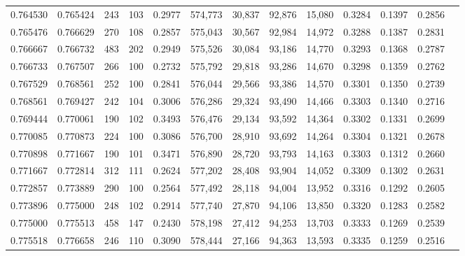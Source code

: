 \begin{tabular}{rrrrrrrrrrrrr}
0.764530 & 0.765424 &    243 &   103 &                                     0.2977 & 574,773 &  30,837 &  92,876 &  15,080 & 0.3284 & 0.1397 & 0.2856 \\
0.765476 & 0.766629 &    270 &   108 &                                     0.2857 & 575,043 &  30,567 &  92,984 &  14,972 & 0.3288 & 0.1387 & 0.2831 \\
0.766667 & 0.766732 &    483 &   202 &                                     0.2949 & 575,526 &  30,084 &  93,186 &  14,770 & 0.3293 & 0.1368 & 0.2787 \\
0.766733 & 0.767507 &    266 &   100 &                                     0.2732 & 575,792 &  29,818 &  93,286 &  14,670 & 0.3298 & 0.1359 & 0.2762 \\
0.767529 & 0.768561 &    252 &   100 &                                     0.2841 & 576,044 &  29,566 &  93,386 &  14,570 & 0.3301 & 0.1350 & 0.2739 \\
0.768561 & 0.769427 &    242 &   104 &                                     0.3006 & 576,286 &  29,324 &  93,490 &  14,466 & 0.3303 & 0.1340 & 0.2716 \\
0.769444 & 0.770061 &    190 &   102 &                                     0.3493 & 576,476 &  29,134 &  93,592 &  14,364 & 0.3302 & 0.1331 & 0.2699 \\
0.770085 & 0.770873 &    224 &   100 &                                     0.3086 & 576,700 &  28,910 &  93,692 &  14,264 & 0.3304 & 0.1321 & 0.2678 \\
0.770898 & 0.771667 &    190 &   101 &                                     0.3471 & 576,890 &  28,720 &  93,793 &  14,163 & 0.3303 & 0.1312 & 0.2660 \\
0.771667 & 0.772814 &    312 &   111 &                                     0.2624 & 577,202 &  28,408 &  93,904 &  14,052 & 0.3309 & 0.1302 & 0.2631 \\
0.772857 & 0.773889 &    290 &   100 &                                     0.2564 & 577,492 &  28,118 &  94,004 &  13,952 & 0.3316 & 0.1292 & 0.2605 \\
0.773896 & 0.775000 &    248 &   102 &                                     0.2914 & 577,740 &  27,870 &  94,106 &  13,850 & 0.3320 & 0.1283 & 0.2582 \\
0.775000 & 0.775513 &    458 &   147 &                                     0.2430 & 578,198 &  27,412 &  94,253 &  13,703 & 0.3333 & 0.1269 & 0.2539 \\
0.775518 & 0.776658 &    246 &   110 &                                     0.3090 & 578,444 &  27,166 &  94,363 &  13,593 & 0.3335 & 0.1259 & 0.2516 \\

\end{tabular}
